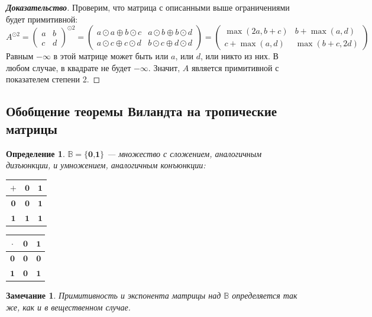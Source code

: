 \documentclass[12pt]{article}
\newtheorem{definition}[theorem]{Определение}
\newtheorem{remark}[theorem]{Замечание}
\begin{document}
\begin{proof}[\textbf{Доказательство}]
Проверим, что матрица с описанными выше ограничениями будет примитивной:
\begin{equation*}A^{\odot 2} = \begin{pmatrix}
a & b \\
c & d
\end{pmatrix}^{\odot 2} = \begin{pmatrix}
a \odot a \oplus b \odot c & a \odot b \oplus b \odot d \\
a \odot c \oplus c \odot d & b \odot c \oplus d \odot d
\end{pmatrix} = \begin{pmatrix}
\max(2a, b + c) & b + \max(a, d) \\
c + \max(a, d) & \max(b + c, 2d)
\end{pmatrix}
\end{equation*}
Равным $-\infty$ в этой матрице может быть или $a$, или $d$, или никто из них. В любом случае, в квадрате не будет $-\infty$. Значит, $A$ является примитивной с показателем степени 2.
\end{proof}
\subsection{Обобщение теоремы Виландта на тропические матрицы}
\begin{definition}
$\mathbb{B} = \{\textbf{0,1}\}$ --- множество с сложением, аналогичным дизъюнкции, и умножением, аналогичным конъюнкции:
\begin{center}
\begin{tabular}{|c|c|c|}
\hline
$+$ & $\textbf{0}$ & $\textbf{1}$ \\
\hline
$\textbf{0}$ & $\textbf{0}$ & $\textbf{1}$ \\
\hline
$\textbf{1}$ & $\textbf{1}$ & $\textbf{1}$ \\
\hline
\end{tabular}
\quad
\begin{tabular}{|c|c|c|}
\hline
$\cdot$ & $\textbf{0}$ & $\textbf{1}$ \\
\hline
$\textbf{0}$ & $\textbf{0}$ & $\textbf{0}$ \\
\hline
$\textbf{1}$ & $\textbf{0}$ & $\textbf{1}$ \\
\hline
\end{tabular}
\end{center}
\end{definition}
\begin{remark}
Примитивность и экспонента матрицы над $\mathbb{B}$ определяется так же, как и в вещественном случае.
\end{remark}
\end{document}
